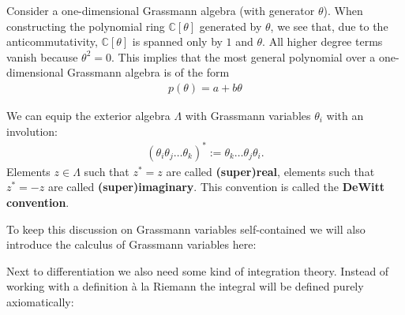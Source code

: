     \begin{property}
        Consider a one-dimensional Grassmann algebra (with generator $\theta$). When constructing the polynomial ring $\mathbb{C}[\theta]$ generated by $\theta$, we see that, due to the anticommutativity, $\mathbb{C}[\theta]$ is spanned only by $1$ and $\theta$. All higher degree terms vanish because $\theta^2 = 0$. This implies that the most general polynomial over a one-dimensional Grassmann algebra is of the form
        \begin{gather}
            p(\theta) = a + b\theta
        \end{gather}
    \end{property}

    \begin{definition}
        We can equip the exterior algebra $\Lambda$ with Grassmann variables $\theta_i$ with an involution:
        \begin{gather}
            (\theta_i\theta_j\ldots\theta_k)^* := \theta_k\ldots\theta_j\theta_i.
        \end{gather}
        Elements $z\in\Lambda$ such that $z^* = z$ are called \textbf{(super)real}, elements such that $z^* = -z$ are called \textbf{(super)imaginary}. This convention is called the \textbf{DeWitt convention}.
    \end{definition}

    To keep this discussion on Grassmann variables self-contained we will also introduce the calculus of Grassmann variables here:

    Next to differentiation we also need some kind of integration theory. Instead of working with a definition \`a la Riemann the integral will be defined purely axiomatically:

